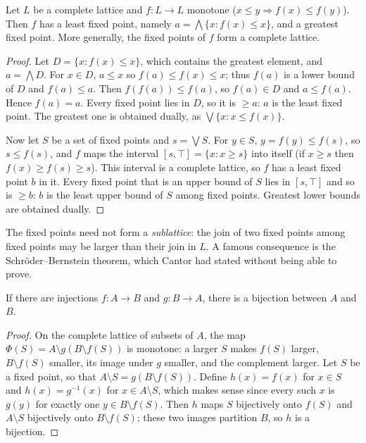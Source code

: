 \begin{theorem}\label{thm:tarski}
Let $L$ be a complete lattice and $f\colon L\to L$ monotone ($x\le y\Rightarrow f(x)\le f(y)$). Then $f$ has a least fixed point, namely
$a=\bigwedge\{x:f(x)\le x\}$, and a greatest fixed point. More generally, the fixed points of $f$ form a complete lattice.
\end{theorem}
\begin{proof}
Let $D=\{x:f(x)\le x\}$, which contains the greatest element, and $a=\bigwedge D$. For $x\in D$, $a\le x$ so $f(a)\le f(x)\le x$; thus $f(a)$ is a lower bound
of $D$ and $f(a)\le a$. Then $f(f(a))\le f(a)$, so $f(a)\in D$ and $a\le f(a)$. Hence $f(a)=a$. Every fixed point lies in $D$, so it is $\ge a$: $a$ is the
least fixed point. The greatest one is obtained dually, as $\bigvee\{x:x\le f(x)\}$.

Now let $S$ be a set of fixed points and $s=\bigvee S$. For $y\in S$, $y=f(y)\le f(s)$, so $s\le f(s)$, and $f$ maps the interval $[s,\top]=\{x:x\ge s\}$
into itself (if $x\ge s$ then $f(x)\ge f(s)\ge s$). This interval is a complete lattice, so $f$ has a least fixed point $b$ in it. Every
fixed point that is an upper bound of $S$ lies in $[s,\top]$ and so is $\ge b$: $b$ is the least upper bound of $S$ among fixed points.
Greatest lower bounds are obtained dually.
\end{proof}

The fixed points need not form a \emph{sublattice}: the join of two fixed points among fixed points may be larger than their
join in $L$. A famous consequence is the Schr\"oder--Bernstein theorem, which Cantor had stated without being able to prove.

\begin{corollary}\label{cor:sb}
If there are injections $f\colon A\to B$ and $g\colon B\to A$, there is a bijection between $A$ and $B$.
\end{corollary}
\begin{proof}
On the complete lattice of subsets of $A$, the map $\Phi(S)=A\setminus g(B\setminus f(S))$ is monotone: a larger $S$ makes $f(S)$ larger, $B\setminus f(S)$
smaller, its image under $g$ smaller, and the complement larger. Let $S$ be a fixed point, so that $A\setminus S=g(B\setminus f(S))$. Define $h(x)=f(x)$ for
$x\in S$ and $h(x)=g^{-1}(x)$ for $x\in A\setminus S$, which makes sense since every such $x$ is $g(y)$ for exactly one $y\in B\setminus f(S)$. Then $h$ maps $S$
bijectively onto $f(S)$ and $A\setminus S$ bijectively onto $B\setminus f(S)$; these two images partition $B$, so $h$ is a bijection.
\end{proof}

